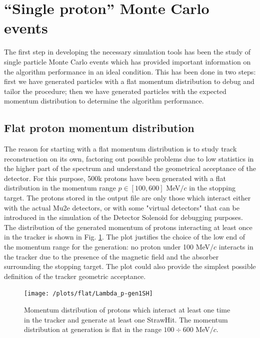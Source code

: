 \documentclass[12pt,a4paper,openright, oneside, titlepage]{book} %
\begin{document}
\section{``Single proton'' Monte Carlo events}
The first step in developing the necessary simulation tools has been the study of single particle Monte Carlo events which has provided important information on the algorithm performance in an ideal condition. 
This has been done in two steps: 
first we have generated particles with a flat momentum distribution to debug and tailor the procedure; 
then we have generated particles with the expected momentum distribution to determine the algorithm performance.

\subsection{Flat proton momentum distribution}
The reason for starting with a flat momentum distribution is to study track reconstruction on its own, 
factoring out possible problems due to low statistics in the higher part of the spectrum 
and understand the geometrical acceptance of the detector. 
For this purpose, 500k protons have been generated 
with a flat distribution in the momentum range $p\in[100,600]$ MeV$/c$ in the stopping target. 
The protons stored in the output file are only those which interact either with the actual Mu2e detectors, 
or with some "virtual detectors" that can be introduced in the simulation 
of the Detector Solenoid for debugging purposes.\\
The distribution of the generated momentum of protons interacting 
at least once in the tracker is shown in Fig. \ref{_flat_Lambda_p-gen1SH}. 
The plot justifies the choice of the low end of the momentum range for the generation: 
no proton under 100 MeV$/c$ interacts in the tracker due to the presence 
of the magnetic field and the absorber surrounding the stopping target. 
The plot could also provide the simplest possible definition 
of the tracker geometric acceptance. \\

\begin{figure}[h!]
\centering
\texttt{[image: /plots/flat/Lambda\_p-gen1SH]}
\caption[Momentum distribution for particles interacting in the tracker]{Momentum distribution of protons which interact 
at least one time in the tracker and generate at least one StrawHit. 
The momentum distribution at generation is flat in the range $100 \div 600$ MeV$/c$.}
\label{_flat_Lambda_p-gen1SH}
\end{figure}
\end{document}
